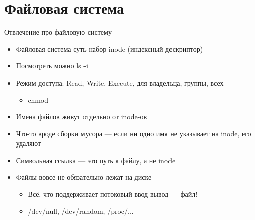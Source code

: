 \documentclass{../../slides-style}
\begin{document}
    \section{Файловая система}

    \begin{frame}{Отвлечение про файловую систему}
        \begin{itemize}
            \item Файловая система суть набор inode (индексный дескриптор)
            \item Посмотреть можно ls -i
            \item Режим доступа: Read, Write, Execute, для владельца, группы, всех
            \begin{itemize}
                \item chmod
            \end{itemize}
            \item Имена файлов живут отдельно от inode-ов
            \item Что-то вроде сборки мусора --- если ни одно имя не указывает на inode, его удаляют
            \item Символьная ссылка --- это путь к файлу, а не inode
            \item Файлы вовсе не обязательно лежат на диске
            \begin{itemize}
                \item Всё, что поддерживает потоковый ввод-вывод --- файл!
                \item /dev/null, /dev/random, /proc/...
            \end{itemize}
        \end{itemize}
    \end{frame}
\end{document}
